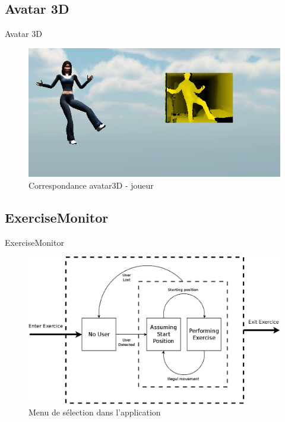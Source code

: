 \subsection{Avatar 3D}
\begin{frame}{Avatar 3D}
\begin{figure}
\begin{center}
\includegraphics[width=0.9\linewidth]{../images/avatar3D}
\caption{Correspondance avatar3D - joueur}
\end{center}
\end{figure}
\end{frame}


\subsection{ExerciseMonitor}
\begin{frame}{ExerciseMonitor}
\begin{figure}
\begin{center}
\includegraphics[width=0.8\linewidth]{../images/exercise_monitor}
\caption{Menu de sélection dans l'application}
\end{center}
\end{figure}
\end{frame}

